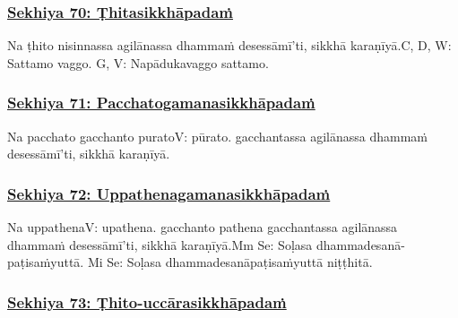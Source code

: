 \subsubsection*{\hyperref[training70]{Sekhiya 70: Ṭhitasikkhāpadaṁ}}
\label{sekh70}

Na ṭhito nisinnassa agilānassa dhammaṁ desessāmī'ti, sikkhā karaṇīyā.\makeatletter\hyperlink{endnote-appendix}\makeatother C, D, W: Sattamo vaggo. G, V: Napādukavaggo sattamo.



\subsubsection*{\hyperref[training71]{Sekhiya 71: Pacchatogamanasikkhāpadaṁ}}
\label{sekh71}

Na pacchato gacchanto purato\makeatletter\hyperlink{endnote-appendix}\makeatother V: pūrato. gacchantassa agilānassa dhammaṁ desessāmī'ti, sikkhā karaṇīyā.



\subsubsection*{\hyperref[training72]{Sekhiya 72: Uppathenagamanasikkhāpadaṁ}}
\label{sekh72}

Na uppathena\makeatletter\hyperlink{endnote-appendix}\makeatother V: upathena. gacchanto pathena gacchantassa agilānassa dhammaṁ desessāmī'ti, sikkhā karaṇīyā.\makeatletter\hyperlink{endnote-appendix}\makeatother Mm Se: Soḷasa dhammadesanā-paṭisaṁyuttā. Mi Se: Soḷasa dhammadesanāpaṭisaṁyuttā niṭṭhitā.



\subsubsection*{\hyperref[training73]{Sekhiya 73: Ṭhito-uccārasikkhāpadaṁ}}
\label{sekh73}

